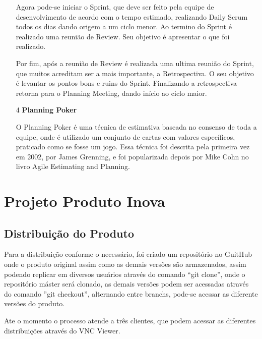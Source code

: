 \documentclass[	DIV=calc,%
							paper=a4,%
							fontsize=12pt,%
							onecolumn]{scrartcl}	 					%
\begin{document}
\begin{itemize}
    Agora pode-se iniciar o Sprint, que deve ser feito pela equipe de desenvolvimento de acordo com o tempo estimado, realizando Daily Scrum todos os dias dando origem a um ciclo menor. Ao termino do Sprint é realizado uma reunião de Review. Seu objetivo é apresentar o que foi realizado.

    Por fim, após a reunião de Review é realizada uma ultima reunião do Sprint, que muitos acreditam ser a mais importante, a Retrospectiva. O seu objetivo é levantar os pontos bons e ruins do Sprint. Finalizando a retrospectiva retorna para o Planning Meeting, dando início ao ciclo maior.
    
    \item[4] {\textbf{Planning Poker}}
    
O Planning Poker é uma técnica de estimativa baseada no consenso de toda a equipe, onde é utilizado um conjunto de cartas com valores específicos, praticado como se fosse um jogo. Essa técnica foi descrita pela primeira vez em 2002, por James Grenning, e foi popularizada depois por Mike Cohn no livro Agile Estimating and Planning.

\end{itemize}

\section{Projeto Produto Inova}

\subsection{Distribuição do Produto}

Para a distribuição conforme o necessário, foi criado um repositório no GuitHub onde o produto original assim como as demais versões são armazenados,  assim podendo replicar em diversos usuários através do comando “git clone”, onde o repositório máster será clonado, as demais versões podem ser acessadas através do comando ”git checkout”, alternando entre branchs, pode-se acessar as diferente versões do produto.

   Ate o momento o processo atende a três clientes, que podem acessar as diferentes distribuições através do VNC Viewer.
\end{document}
